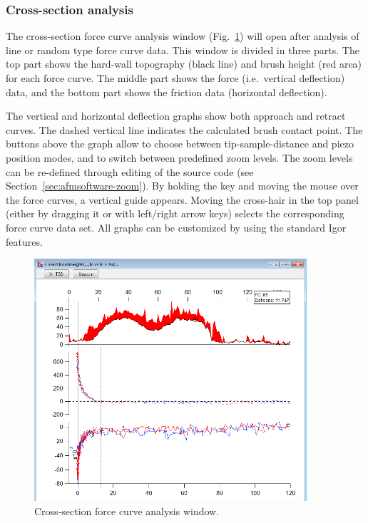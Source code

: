 \documentclass[12pt,a4paper]{article}
\begin{document}
\subsubsection{Cross-section analysis}
The cross-section force curve analysis window (Fig.~\ref{fig:afmsoftware-xsectgraph}) will open after analysis of line or random type force curve data. This window is divided in three parts.
The top part shows the hard-wall topography (black line) and brush height (red area) for each force curve. The middle part shows the force (i.e.\ vertical deflection) data, and the bottom part shows the friction data (horizontal deflection).

The vertical and horizontal deflection graphs show both approach and retract curves. The dashed vertical line indicates the calculated brush contact point.
The buttons above the graph allow to choose between tip-sample-distance and piezo position modes, and to switch between predefined zoom levels.
The zoom levels can be re-defined through editing of the source code (see Section~\ref{sec:afmsoftware-zoom}).
By holding the  key and moving the mouse over the force curves, a vertical guide appears.
Moving the cross-hair in the top panel (either by dragging it or with left/right arrow keys) selects the corresponding force curve data set.
All graphs can be customized by using the standard Igor features.

\begin{figure}[htbp]
	\centering
		\includegraphics[width=0.9\textwidth]{fig--afmsoftware-xsection-graph.png}
	\caption[Cross-section force curve analysis]{Cross-section force curve analysis window.}
	\label{fig:afmsoftware-xsectgraph}
\end{figure}
\end{document}
